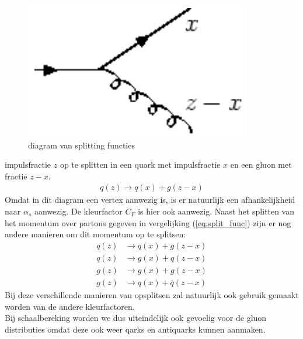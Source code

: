 \documentclass[../main.tex]{subfiles}
\begin{document}
\begin{figure}
    \centering
    \includegraphics[width=0.9\linewidth]{QCD/split_func.png}
    \caption{diagram van splitting functies}
    \label{fig:split_func}
\end{figure}\noindent

impulsfractie $z$ op te splitten in een quark met impulsfractie $x$ en een gluon met fractie $z-x$.
\begin{equation}
    \begin{aligned}
        \label{eq:split_func}
        q(z)\rightarrow q(x) + g(z-x)
    \end{aligned}
\end{equation}
Omdat in dit diagram een vertex aanwezig is, is er natuurlijk een afhankelijkheid naar $\alpha_s$ aanwezig. De kleurfactor $C_F$ is hier ook aanwezig. Naast het splitten van het momentum over partons gegeven in vergelijking (\ref{eq:split_func}) zijn er nog andere manieren om dit momentum op te splitsen:
\begin{equation}
    \begin{aligned}
        \label{eq:split_func_all}
        q(z)&\rightarrow q(x) + g(z-x)\\
        q(z)&\rightarrow g(x) + q(z-x)\\
        g(z)&\rightarrow g(x) + g(z-x)\\
        g(z)&\rightarrow q(x) + \overline q(z-x)
    \end{aligned}
\end{equation}
Bij deze verschillende manieren van opsplitsen zal natuurlijk ook gebruik gemaakt worden van de andere kleurfactoren.\\
Bij schaalbereking worden we dus uiteindelijk ook gevoelig voor de gluon distributies omdat deze ook weer qarks en antiquarks kunnen aanmaken.
\end{document}

